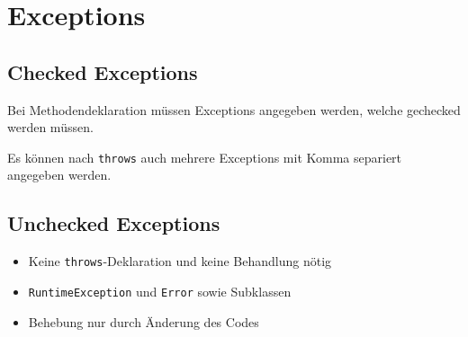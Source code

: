 \section{Exceptions}

\begin{minipage}[t]{0.6\columnwidth}
    \subsection{Checked Exceptions}
    \raggedright%
    Bei Methodendeklaration müssen Exceptions angegeben werden, welche gechecked werden müssen.
    
    Es können nach \lstinline{throws} auch mehrere Exceptions mit Komma separiert angegeben werden.
\end{minipage}\hfill%
\begin{minipage}[t]{0.4\columnwidth}
    \subsection{Unchecked Exceptions}
    \raggedright%
    \begin{itemize}
        \item Keine \lstinline{throws}-Deklaration und keine Behandlung nötig
        \item \lstinline{RuntimeException} und \lstinline{Error} sowie Subklassen
        \item Behebung nur durch Änderung des Codes
    \end{itemize}
\end{minipage}

